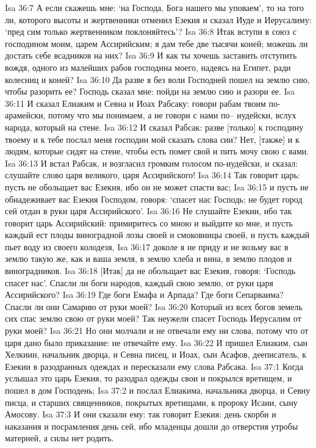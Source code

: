 Isa 36:7  А если скажешь мне: `на Господа, Бога нашего мы уповаем', то на того ли, которого высоты и жертвенники отменил Езекия и сказал Иуде и Иерусалиму: `пред сим только жертвенником поклоняйтесь'?
Isa 36:8  Итак вступи в союз с господином моим, царем Ассирийским; я дам тебе две тысячи коней; можешь ли достать себе всадников на них?
Isa 36:9  И как ты хочешь заставить отступить вождя, одного из малейших рабов господина моего, надеясь на Египет, ради колесниц и коней?
Isa 36:10  Да разве я без воли Господней пошел на землю сию, чтобы разорить ее? Господь сказал мне: пойди на землю сию и разори ее.
Isa 36:11  И сказал Елиаким и Севна и Иоах Рабсаку: говори рабам твоим по-арамейски, потому что мы понимаем, а не говори с нами по-- иудейски, вслух народа, который на стене.
Isa 36:12  И сказал Рабсак: разве [только] к господину твоему и к тебе послал меня господин мой сказать слова сии? Нет, [также] и к людям, которые сидят на стене, чтобы есть помет свой и пить мочу свою с вами.
Isa 36:13  И встал Рабсак, и возгласил громким голосом по-иудейски, и сказал: слушайте слово царя великого, царя Ассирийского!
Isa 36:14  Так говорит царь: пусть не обольщает вас Езекия, ибо он не может спасти вас;
Isa 36:15  и пусть не обнадеживает вас Езекия Господом, говоря: `спасет нас Господь; не будет город сей отдан в руки царя Ассирийского'.
Isa 36:16  Не слушайте Езекии, ибо так говорит царь Ассирийский: примиритесь со мною и выйдите ко мне, и пусть каждый ест плоды виноградной лозы своей и смоковницы своей, и пусть каждый пьет воду из своего колодезя,
Isa 36:17  доколе я не приду и не возьму вас в землю такую же, как и ваша земля, в землю хлеба и вина, в землю плодов и виноградников.
Isa 36:18  [Итак] да не обольщает вас Езекия, говоря: `Господь спасет нас'. Спасли ли боги народов, каждый свою землю, от руки царя Ассирийского?
Isa 36:19  Где боги Емафа и Арпада? Где боги Сепарваима? Спасли ли они Самарию от руки моей?
Isa 36:20  Который из всех богов земель сих спас землю свою от руки моей? Так неужели спасет Господь Иерусалим от руки моей?
Isa 36:21  Но они молчали и не отвечали ему ни слова, потому что от царя дано было приказание: не отвечайте ему.
Isa 36:22  И пришел Елиаким, сын Хелкиин, начальник дворца, и Севна писец, и Иоах, сын Асафов, дееписатель, к Езекии в разодранных одеждах и пересказали ему слова Рабсака.
Isa 37:1  Когда услышал это царь Езекия, то разодрал одежды свои и покрылся вретищем, и пошел в дом Господень;
Isa 37:2  и послал Елиакима, начальника дворца, и Севну писца, и старших священников, покрытых вретищами, к пророку Исаии, сыну Амосову.
Isa 37:3  И они сказали ему: так говорит Езекия: день скорби и наказания и посрамления день сей, ибо младенцы дошли до отверстия утробы матерней, а силы нет родить.
